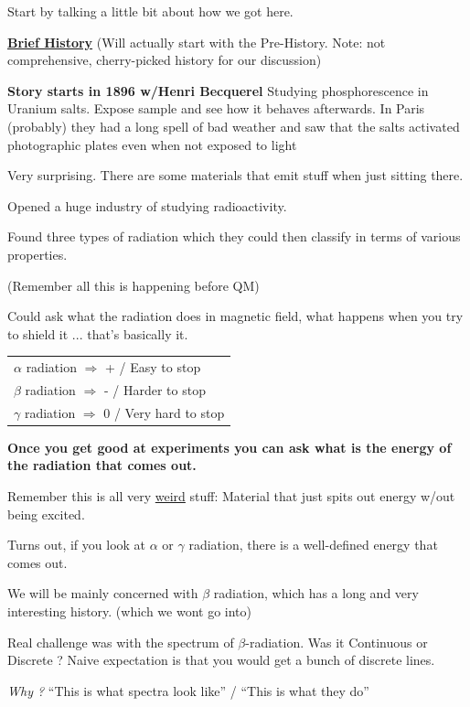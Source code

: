 {\clearpage

Start by talking a little bit about how we got here.

\textbf{\underline{Brief History} } (Will actually start with the Pre-History. Note: not comprehensive, cherry-picked history for our discussion) 

\textbf{Story starts in 1896 w/Henri Becquerel}
Studying phosphorescence in Uranium salts. Expose sample and see how it behaves afterwards.  
In Paris (probably) they had a long spell of bad weather and saw that the salts activated photographic plates even when not exposed to light

Very surprising. There are some materials that emit stuff when just sitting there.

Opened a huge industry of studying radioactivity.

Found three types of radiation which they could then classify in terms of various properties. 

(Remember all this is happening before QM) 

Could ask what the radiation does in magnetic field, what happens when you try to shield it ... that's basically it.

\begin{tabular}{l}
$\alpha$ radiation $\Rightarrow$ +  / Easy to stop\\
$\beta$ radiation $\Rightarrow$ -  / Harder to stop \\
$\gamma$ radiation $\Rightarrow$ 0 / Very hard to stop \\
\end{tabular}

\textbf{Once you get good at experiments you can ask what is the energy of the radiation that comes out.}

Remember this is all very \underline{weird} stuff: Material that just spits out energy w/out being excited.

Turns out, if you look at $\alpha$ or $\gamma$ radiation, there is a well-defined energy that comes out. 

We will be mainly concerned with $\beta$ radiation, which has a long and very interesting history. (which we wont go into) 

Real challenge was with the spectrum of $\beta$-radiation. 
Was it Continuous or Discrete ?
Naive expectation is that you would get a bunch of discrete lines.  

\textit{Why ?}  ``This is what spectra look like'' / ``This is what they do''

}
